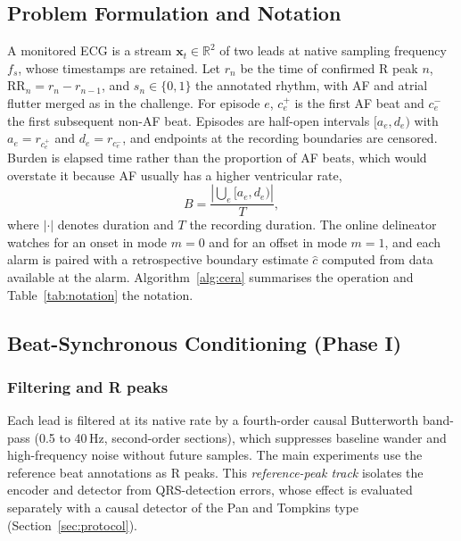 \documentclass[preprint,12pt]{elsarticle}
\newcommand{\1}{\mathbf{1}}
\begin{document}
\subsection{Problem Formulation and Notation}
\label{sec:formulation}
A monitored ECG is a stream $\bm{x}_t\in\mathbb{R}^{2}$ of two leads at native sampling frequency $f_s$, whose timestamps are retained. Let $r_n$ be the time of confirmed R peak $n$, $\mathrm{RR}_n=r_n-r_{n-1}$, and $s_n\in\{0,1\}$ the annotated rhythm, with AF and atrial flutter merged as in the challenge. For episode $e$, $c_e^+$ is the first AF beat and $c_e^-$ the first subsequent non-AF beat. Episodes are half-open intervals $[a_e,d_e)$ with $a_e=r_{c_e^+}$ and $d_e=r_{c_e^-}$, and endpoints at the recording boundaries are censored. Burden is elapsed time rather than the proportion of AF beats, which would overstate it because AF usually has a higher ventricular rate,
\begin{equation}
B=\frac{\left|\bigcup_e[a_e,d_e)\right|}{T},
\label{eq:burden}
\end{equation}
where $|\cdot|$ denotes duration and $T$ the recording duration. The online delineator watches for an onset in mode $m=0$ and for an offset in mode $m=1$, and each alarm is paired with a retrospective boundary estimate $\hat c$ computed from data available at the alarm. Algorithm~\ref{alg:cera} summarises the operation and Table~\ref{tab:notation} the notation.



\subsection{Beat-Synchronous Conditioning (Phase I)}
\label{sec:phase1}
\subsubsection{Filtering and R peaks}
Each lead is filtered at its native rate by a fourth-order causal Butterworth band-pass (0.5 to 40\,Hz, second-order sections), which suppresses baseline wander and high-frequency noise without future samples. The main experiments use the reference beat annotations as R peaks. This \emph{reference-peak track} isolates the encoder and detector from QRS-detection errors, whose effect is evaluated separately with a causal detector of the Pan and Tompkins type \cite{pan1985} (Section~\ref{sec:protocol}).
\end{document}

